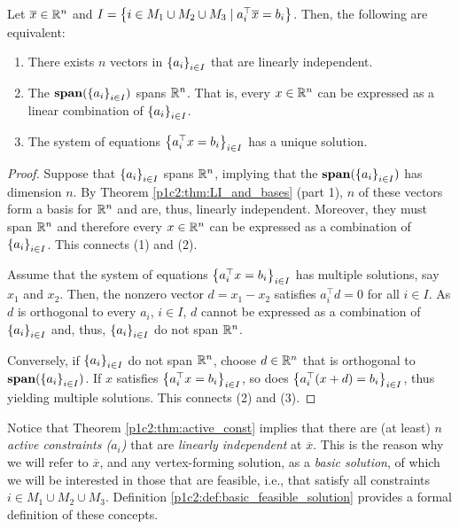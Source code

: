 \begin{theorem}\label{p1c2:thm:active_const}
	Let $\overline{x} \in \mathbb{R}^n$ and $I = \left\{  i \in M_1 \cup M_2 \cup M_3 \mid a_i^\top \overline{x} = b_i \right \}$. Then, the following are equivalent:
	\begin{enumerate}
		\item There exists $n$ vectors in $\left\{ a_i \right \}_{i \in I}$ that are linearly independent.  
		\item The $\mathop{\bf span}(\left\{ a_i \right \}_{i \in I})$ spans $\mathbb{R}^n$. That is, every $x \in \mathbb{R}^n$ can be expressed as a linear combination of $\left\{ a_i \right \}_{i \in I}$.
		\item The system of equations $\left\{ a_i ^\top x = b_i \right \}_{i \in I}$ has a unique solution.
	\end{enumerate}
\end{theorem}

\begin{proof}
	Suppose that $\left\{ a_i \right \}_{i \in I}$ spans $\mathbb{R}^n$, implying that the $\mathop{\bf span}(\left\{ a_i \right \}_{i \in I})$ has dimension $n$. By Theorem \ref{p1c2:thm:LI_and_bases} (part 1), $n$ of these vectors form a basis for $\mathbb{R}^n$ and are, thus, linearly independent. Moreover, they must span $\mathbb{R}^n$ and therefore every $x \in \mathbb{R}^n$ can be expressed as a combination of $\left\{ a_i \right \}_{i \in I}$. This connects (1) and (2).
	
	Assume that the system of equations $\left\{ a_i ^\top x = b_i \right \}_{i \in I}$ has multiple solutions, say $x_1$ and $x_2$. Then, the nonzero vector $d = x_1 - x_2$ satisfies $a_i^\top d = 0$ for all $i \in I$. As $d$ is orthogonal to every $a_i$, $i \in I$, $d$ cannot be expressed as a combination of $\left\{ a_i \right \}_{i \in I}$ and, thus, $\left\{ a_i \right \}_{i \in I}$ do not span $\mathbb{R}^n$.
	
	Conversely, if $\left\{ a_i \right \}_{i \in I}$ do not span $\mathbb{R}^n$, choose $d \in \mathbb{R}^n$ that is orthogonal to $\mathop{\bf span}(\left\{ a_i \right \}_{i \in I})$. If $x$ satisfies $\left\{ a_i ^\top x = b_i \right \}_{i \in I}$, so does $\left\{ a_i ^\top (x + d) = b_i \right \}_{i \in I}$, thus yielding multiple solutions. This connects (2) and (3). \qedhere
\end{proof}

Notice that Theorem \ref{p1c2:thm:active_const} implies that there are (at least) \emph{$n$ active constraints ($a_i$)} that are \emph{linearly independent} at $\overline{x}$. This is the reason why we will refer to $\overline{x}$, and any vertex-forming solution, as a \emph{basic solution}, of which we will be interested in those that are feasible, i.e., that satisfy all constraints $i \in M_1 \cup M_2 \cup M_3$. Definition \ref{p1c2:def:basic_feasible_solution} provides a formal definition of these concepts.

